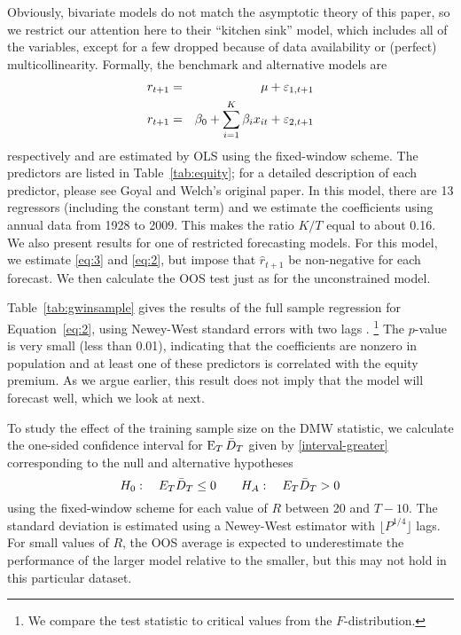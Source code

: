 \documentclass[12pt]{article}
\begin{document}
Obviously,  bivariate models do not
match the asymptotic theory of this paper, so we restrict our
attention here to their ``kitchen sink'' model, which includes all of
the variables, except for a few dropped because of data availability or
(perfect) multicollinearity.  Formally, the benchmark and alternative models are
\begin{eqnarray}
  \label{eq:3}
  r_{t+1} &=& \mu + \varepsilon_{1,t+1} \\
  \label{eq:2}
r_{t+1} &=& \beta_0 + \sum_{i=1}^K \beta_{i} x_{it} + \varepsilon_{2,t+1}
\end{eqnarray}
respectively and are estimated by OLS using the fixed-window scheme.
The predictors are listed in Table~\ref{tab:equity}; for a detailed
description of each predictor, please see Goyal and Welch's original
paper.  In this model, there are 13 regressors (including the constant
term) and we estimate the coefficients using annual data from 1928 to
2009.  This makes the ratio $K/T$ equal to about 0.16.  We also
present results for one of 
restricted forecasting models.  For this model, we estimate
\eqref{eq:3} and \eqref{eq:2}, but impose that $\hat r_{t+1}$ be
non-negative for each forecast.  We then calculate the OOS test just
as for the unconstrained model.

Table~\ref{tab:gwinsample} gives the results of the full sample
regression for Equation~\eqref{eq:2}, using Newey-West standard errors
with two lags \citep{NeW:87}.%
\footnote{We compare the test statistic
  to critical values from the $F$-distribution.} %
The $p$-value is
very small (less than 0.01), indicating that the coefficients are
nonzero in population and at least one of these predictors is
correlated with the equity premium.  As we argue earlier, this result
does not imply that the model will forecast well, which we look at
next.

To study the effect of the training sample size on the DMW statistic, we
calculate the one-sided confidence interval for $\operatorname{E}_T \bar{D}_{T}$ given
by \eqref{interval-greater} corresponding to the null and alternative
hypotheses
\[ H_0: \quad E_T \bar{D}_{T} \leq 0 \qquad
H_A: \quad E_T \bar{D}_{T} > 0
\]
using the fixed-window scheme for each value of $R$ between 20 and
$T-10$.  The standard deviation is estimated using a Newey-West
estimator with $\lfloor P^{1/4}\rfloor$ lags.  For small values of
$R$, the OOS average is expected to underestimate the performance of
the larger model relative to the smaller, but this may not hold in
this particular dataset.
\end{document}
